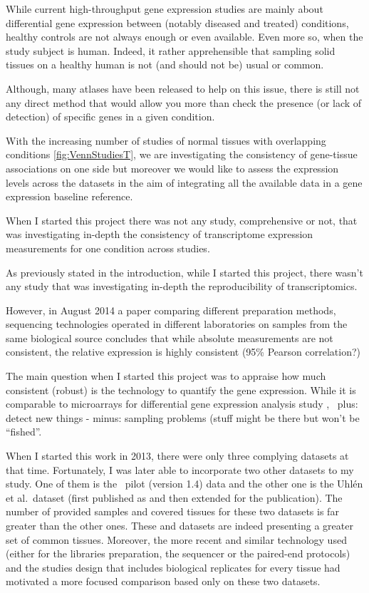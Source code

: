 While current high-throughput gene expression studies are mainly about
differential gene expression between (notably diseased and treated) conditions,
healthy controls are not always enough or even available. Even more so, when the
study subject is human. Indeed, it rather apprehensible that sampling solid
tissues on a healthy human is not (and should not be) usual or common.

Although, many atlases have been released to help on this issue,
there is still not any direct method that would allow you more than check the
presence (or lack of detection) of specific genes in a given condition.

With the increasing number of studies of normal tissues with overlapping conditions
\cref{fig:VennStudiesT}, we are investigating the consistency of gene-tissue
associations on
one side but moreover we would like to assess the expression levels across the
datasets in the aim of integrating all the available data in a gene expression
baseline reference.

When I started this project there was not any study, comprehensive or not, that
was investigating in-depth the consistency of transcriptome expression measurements
for one condition across studies.

As previously stated in the introduction, while I started this project,
there wasn't any study that was investigating in-depth the reproducibility of
transcriptomics.

However, in August 2014 a paper comparing different preparation methods,
sequencing technologies operated in different laboratories
on samples from the same biological source concludes that while absolute
measurements are not consistent, the relative expression is highly consistent
(95\% Pearson correlation?)

The main question when I started this project was to appraise how much consistent
(robust) is the \Rnaseq technology to quantify the gene expression. While it
is comparable to microarrays for differential gene expression analysis study
,
\Rnaseq\ plus: detect new things - minus: sampling problems (stuff might be there
but won't be ``fished''.


When I started this work in 2013, there were only three complying
datasets at that time. Fortunately, I was later
able to incorporate two other datasets to my study. One of them is the \Gtex\
pilot (version 1.4) data and the other one is the Uhlén et al.\ dataset (first
published as \citet{Uhlen2014} and then extended for the \citet{Uhlen2015} publication).
The number of provided samples and covered tissues for these two datasets
is far greater than the other ones. These \dataset{\Gtex} and 
datasets are indeed presenting a greater set of common tissues. Moreover,
the more recent and similar technology used (either for the libraries preparation,
the sequencer or the paired-end protocols) and the studies design that includes
biological replicates for every tissue had motivated a more focused comparison
based only on these two datasets.

